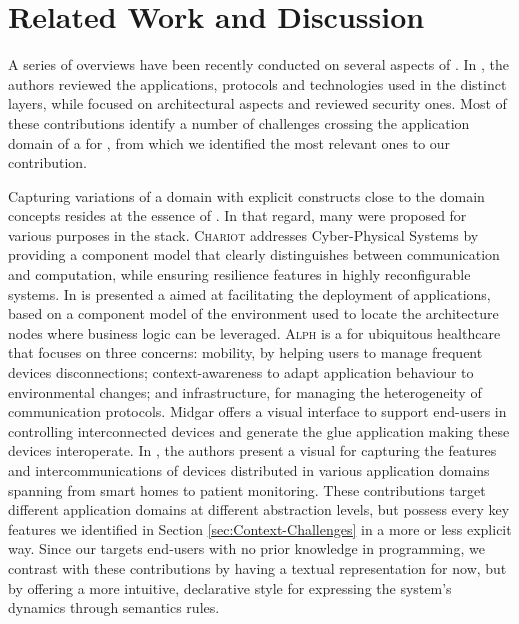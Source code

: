 \section{Related Work and Discussion}
\label{sec:RW}

A series of overviews have been recently conducted on several aspects of \IOT. In \cite{J:AlFuqaha-etAl:2014,xu-14a}, the authors reviewed the applications, protocols and technologies used in the distinct \IOT layers, while \cite{singh-14,gubbi-13} focused on architectural aspects and \cite{tan-10,xu-14b} reviewed security ones. Most of these contributions identify a number of challenges crossing the application domain of a \DSL for \IOT, from which we identified the most relevant ones to our contribution.

Capturing variations of a domain with explicit constructs close to the domain concepts resides at the essence of \DSLS. In that regard, many \DSLS were proposed for various purposes in the \IOT stack. \textsc{Chariot} \cite{Pradhan-etAl:2015} addresses Cyber-Physical Systems by providing a component model that clearly distinguishes between communication and computation, while ensuring resilience features in highly reconfigurable systems. In \cite{Brandzaeg-Mohagheghi-Mosser:2012} is presented a \DSL aimed at facilitating the deployment of applications, based on a component model of the environment used to locate the architecture nodes where business logic can be leveraged. \textsc{Alph} \cite{Munnelly-Clarke:2008} is a \DSL for ubiquitous healthcare that focuses on three concerns: mobility, by helping users to manage frequent devices disconnections; context-awareness to adapt application behaviour to environmental changes; and infrastructure, for managing the heterogeneity of communication protocols. Midgar \cite{J:Garcia-etAl:2014} offers a visual interface to support end-users in controlling interconnected devices and generate the glue application making these devices interoperate. In \cite{Salihbegovic-Eterovic-Kaljic-Ribic:2015}, the authors present a visual \DSL for capturing the features and intercommunications of devices distributed in various application domains spanning from smart homes to patient monitoring. These contributions target different application domains at different abstraction levels, but possess every key features we identified in Section \ref{sec:Context-Challenges} in a more or less explicit way. Since our \DSL targets end-users with no prior knowledge in programming, we contrast with these contributions by having a textual representation for now, but by offering a more intuitive, declarative style for expressing the system's dynamics through semantics rules.


